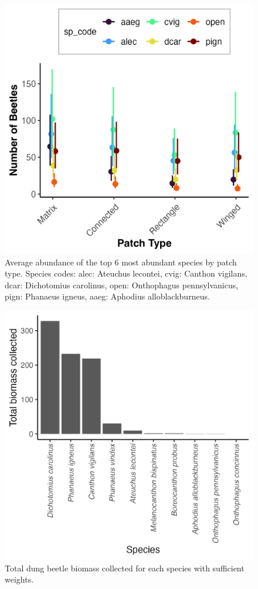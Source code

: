 \documentclass[
  man, donotrepeattitle]{apa6}
\begin{document}
\newpage

\begin{figure}[H]

{\centering \includegraphics[width=0.7\linewidth,]{images/sp_abund_patch} 

}

\caption{Average abundance of the top 6 most abundant species by patch type. Species codes: alec: Ateuchus lecontei, cvig: Canthon vigilans, dcar: Dichotomius carolinus, open: Onthophagus pennsylvanicus, pign: Phanaeus igneus, aaeg: Aphodius alloblackburneus.}\label{fig:abundance}
\end{figure}

\newpage

\begin{figure}[H]

{\centering \includegraphics[width=0.7\linewidth,]{images/sp_biomass_plot} 

}

\caption{Total dung beetle biomass collected for each species with sufficient weights.}\label{fig:sp-bmass}
\end{figure}
\end{document}
